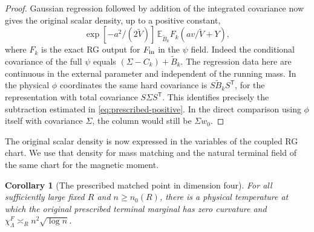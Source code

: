\documentclass[11pt]{article}
\newtheorem{corollary}[theorem]{Corollary}
\theoremstyle{definition}
\newcommand{\E}{\mathbb E}
\begin{document}
\begin{proof}
Gaussian regression followed by addition of the integrated
covariance now gives the original scalar density, up to a
positive constant,
\begin{equation}
 \exp[-a^2/(2\widetilde V)]\,
 \E_{\widetilde B_k}F_k(a v/\widetilde V+Y),
 \label{eq:aligned-original-density}
\end{equation}
where \(F_k\) is the exact RG output for \(F_{\rm in}\)
in the \(\psi\) field. Indeed the conditional covariance of the
full \(\psi\) equals \((\Sigma-C_k)+\widetilde B_k\).
The regression data here are continuous in the external
parameter and independent of the running mass. In the physical
\(\phi\) coordinates the same hard covariance is
\(S\widetilde B_k S^{\mathsf T}\), for the representation with
total covariance \(S\Sigma S^{\mathsf T}\). This identifies
precisely the subtraction estimated in
\eqref{eq:prescribed-positive}. In the direct comparison using
\(\phi\) itself with covariance \(\Sigma\), the column would
still be \(\Sigma w_0\).
\end{proof}

The original scalar density is now expressed in the variables of the
coupled RG chart. We use that density for mass matching and the
natural terminal field of the same chart for the magnetic moment.

\begin{corollary}[The prescribed matched point in dimension four]
\label{cor:d4-prescribed}
For all sufficiently large fixed \(R\) and \(n\ge n_0(R)\),
there is a physical temperature at which the original prescribed
terminal marginal has zero curvature and
\(\chi_\Lambda^F\asymp_R n^2\sqrt{\log n}\).
\end{corollary}
\end{document}

